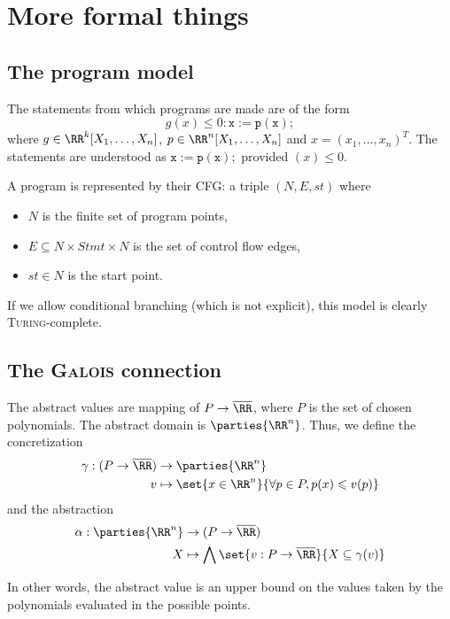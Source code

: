 \documentclass[a4paper, twoside, 10pt]{article}
\begin{document}
\section{More formal things}

\subsection{The program model}

The statements from which programs are made are of the form
\[
    g(x) \leqslant 0: \mathtt{x := p(x);}
\]
where $g\in\RR^k[X_1,\ldots,X_n]$, $p\in\RR^n[X_1,\ldots,X_n]$ and $x=(x_1,\ldots,x_n)^T$. The statements are understood as $\mathtt{x := p(x);}$ provided $(x) \leqslant 0$.

\bigskip

A program is represented by their CFG: a triple $(N, E, st)$ where
\begin{itemize}
    \item $N$ is the finite set of program points,
    \item $E \subseteq N\times Stmt \times N$ is the set of control flow edges,
    \item $st \in N$ is the start point.
\end{itemize}

If we allow conditional branching (which is not explicit), this model is clearly \textsc{Turing}-complete.


\subsection{The \textsc{Galois} connection}

The abstract values are mapping of $P \to \overline{\RR}$, where $P$ is the set of chosen polynomials. The abstract domain is $\parties{\RR^n}$. Thus, we define the concretization
\[
    \begin{aligned}
        \gamma:(P\to\overline{\RR}) &\to \parties{\RR^n}\\
        v &\mapsto \set{x\in\RR^n}{\forall p\in P, p(x) \leqslant v(p)}
    \end{aligned}
\]
and the abstraction
\[
    \begin{aligned}
        \alpha:\parties{\RR^n} &\to (P\to\overline{\RR})\\
        X &\mapsto \bigwedge \set{v:P\to\overline{\RR}}{X\subseteq \gamma(v)}
    \end{aligned}
\]

In other words, the abstract value is an upper bound on the values taken by the polynomials evaluated in the possible points.
\end{document}
